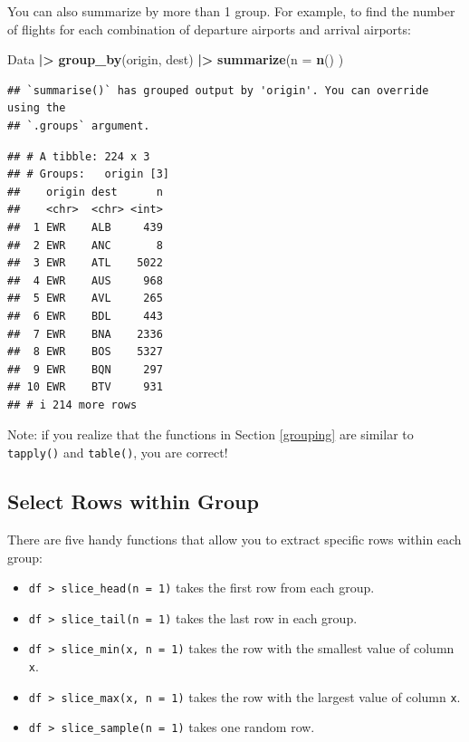 \documentclass[
]{book}
\newenvironment{Shaded}{\begin{snugshade}}{\end{snugshade}}
\newcommand{\AttributeTok}[1]{\textcolor[rgb]{0.13,0.29,0.53}{#1}}
\newcommand{\FunctionTok}[1]{\textcolor[rgb]{0.13,0.29,0.53}{\textbf{#1}}}
\newcommand{\NormalTok}[1]{#1}
\newcommand{\SpecialCharTok}[1]{\textcolor[rgb]{0.81,0.36,0.00}{\textbf{#1}}}
\providecommand{\tightlist}{%
  \setlength{\itemsep}{0pt}\setlength{\parskip}{0pt}}
\theoremstyle{definition}
\theoremstyle{definition}
\theoremstyle{definition}
\theoremstyle{definition}
\theoremstyle{remark}
\begin{document}
You can also summarize by more than 1 group. For example, to find the number of flights for each combination of departure airports and arrival airports:

\begin{Shaded}
\begin{Highlighting}[]
\NormalTok{Data }\SpecialCharTok{|\textgreater{}} 
  \FunctionTok{group\_by}\NormalTok{(origin, dest) }\SpecialCharTok{|\textgreater{}} 
  \FunctionTok{summarize}\NormalTok{(}\AttributeTok{n =} \FunctionTok{n}\NormalTok{()}
\NormalTok{  )}
\end{Highlighting}
\end{Shaded}

\begin{verbatim}
## `summarise()` has grouped output by 'origin'. You can override using the
## `.groups` argument.
\end{verbatim}

\begin{verbatim}
## # A tibble: 224 x 3
## # Groups:   origin [3]
##    origin dest      n
##    <chr>  <chr> <int>
##  1 EWR    ALB     439
##  2 EWR    ANC       8
##  3 EWR    ATL    5022
##  4 EWR    AUS     968
##  5 EWR    AVL     265
##  6 EWR    BDL     443
##  7 EWR    BNA    2336
##  8 EWR    BOS    5327
##  9 EWR    BQN     297
## 10 EWR    BTV     931
## # i 214 more rows
\end{verbatim}

Note: if you realize that the functions in Section \ref{grouping} are similar to \texttt{tapply()} and \texttt{table()}, you are correct!

\hypertarget{select-rows-within-group}{%
\subsection{Select Rows within Group}\label{select-rows-within-group}}

There are five handy functions that allow you to extract specific rows within each group:

\begin{itemize}
\tightlist
\item
  \texttt{df\ \textbar{}\textgreater{}\ slice\_head(n\ =\ 1)} takes the first row from each group.
\item
  \texttt{df\ \textbar{}\textgreater{}\ slice\_tail(n\ =\ 1)} takes the last row in each group.
\item
  \texttt{df\ \textbar{}\textgreater{}\ slice\_min(x,\ n\ =\ 1)} takes the row with the smallest value of column \texttt{x}.
\item
  \texttt{df\ \textbar{}\textgreater{}\ slice\_max(x,\ n\ =\ 1)} takes the row with the largest value of column \texttt{x}.
\item
  \texttt{df\ \textbar{}\textgreater{}\ slice\_sample(n\ =\ 1)} takes one random row.
\end{itemize}
\end{document}
